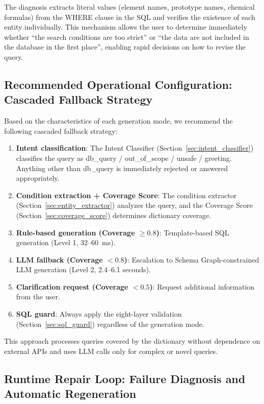 \documentclass[5p,twocolumn]{elsarticle}
\begin{document}
The diagnosis extracts literal values (element names, prototype names, chemical formulas) from the WHERE clause in the SQL
and verifies the existence of each entity individually.
This mechanism allows the user to determine immediately
whether ``the search conditions are too strict''
or ``the data are not included in the database in the first place'',
enabling rapid decisions on how to revise the query.

\subsection{Recommended Operational Configuration: Cascaded Fallback Strategy}
\label{sec:cascade}

Based on the characteristics of each generation mode, we recommend the following cascaded fallback strategy:

\begin{enumerate}
  \item \textbf{Intent classification}: The Intent Classifier (Section~\ref{sec:intent_classifier})
    classifies the query as db\_query / out\_of\_scope / unsafe / greeting.
    Anything other than db\_query is immediately rejected or answered appropriately.
  \item \textbf{Condition extraction + Coverage Score}:
    The condition extractor (Section~\ref{sec:entity_extractor}) analyzes the query, and
    the Coverage Score (Section~\ref{sec:coverage_score}) determines dictionary coverage.
  \item \textbf{Rule-based generation (Coverage $\geq 0.8$)}:
    Template-based SQL generation (Level 1, 32--60~ms).
  \item \textbf{LLM fallback (Coverage $< 0.8$)}:
    Escalation to Schema Graph-constrained LLM generation (Level 2, 2.4--6.1 seconds).
  \item \textbf{Clarification request (Coverage $< 0.5$)}:
    Request additional information from the user.
  \item \textbf{SQL guard}: Always apply the eight-layer validation (Section~\ref{sec:sql_guard}) regardless of the generation mode.
\end{enumerate}

This approach processes queries covered by the dictionary
without dependence on external APIs and uses LLM calls only for complex or novel queries.

\subsection{Runtime Repair Loop: Failure Diagnosis and Automatic Regeneration}
\label{sec:repair_loop}
\end{document}
